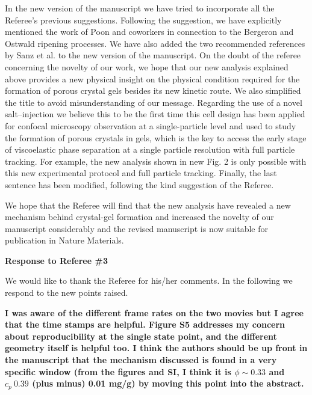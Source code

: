 \documentclass[11pt,a4paper]{article}
\newenvironment{referee}%
{\bigskip\singlespacing\bf}%
{\par\bigskip}
\begin{document}
In the new version of the manuscript we have tried to incorporate all the Referee's previous suggestions. 
Following the suggestion, we have explicitly mentioned the work of Poon and coworkers in connection to the Bergeron and Ostwald ripening processes.  
We have also added the two recommended references by Sanz et al. to the new version of the manuscript. 
On the doubt of the referee concerning the novelty of our work, we hope that our new analysis explained above provides a 
new physical insight on the physical condition required for the formation of porous crystal gels besides its new kinetic route. 
We also simplified the title to avoid misunderstanding of our message. Regarding the use of a novel salt--injection we believe this to be the first time this cell design has been applied for confocal microscopy observation at a single-particle level and 
used to study the formation of porous crystals in gels, 
which is the key to access the early stage of viscoelastic phase separation at a single particle resolution with full particle tracking. 
For example, the new analysis shown in new Fig. 2 is only possible with this new experimental protocol and full particle tracking.  
Finally, the last sentence has been modified, following the kind suggestion of the Referee. 

\vskip 0.5cm

We hope that the Referee will find that the new analysis have revealed a new mechanism behind 
crystal-gel formation and increased the novelty of our manuscript considerably and 
the revised manuscript is now suitable for publication in Nature Materials.  

\clearpage

\noindent
\begin{Large}
{\bf Response to Referee \#3}
\end{Large}


\vskip 0.5cm

We would like to thank the Referee for his/her comments. In the following we respond to the new points raised.

\begin{referee}
I was aware of the different frame rates on the two movies but I agree that the time stamps are helpful. Figure S5 addresses my concern about reproducibility at the single state point, and the different geometry itself is helpful too. I think the authors should be up front in the manuscript that the mechanism discussed is found in a very specific window (from the figures and SI, I think it is $\phi\sim 0.33$ and $c_p~0.39$ (plus minus) 0.01 mg/g) by moving this point into the abstract.
\end{referee}
\end{document}
